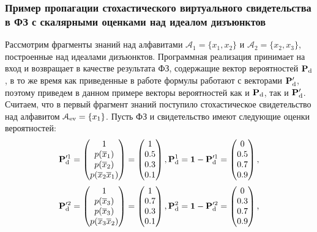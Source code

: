 \subsubsection{Пример пропагации стохастического виртуального свидетельства в ФЗ с скалярными оценками над идеалом дизъюнктов}
Рассмотрим фрагменты знаний над алфавитами $\mathcal{A}_1 = \{x_1, x_2\}$ и  $\mathcal{A}_2 = \{x_2, x_3\}$, построенные над идеалами дизъюнктов. Программная реализация принимает на вход и возвращает в качестве результата ФЗ, содержащие вектор вероятностей $\mathbf{P}_\mathrm{d}$, в то же время как приведенные в работе формулы работают с векторами $\mathbf{P}_\mathrm{d}^{\prime}$, поэтому приведем в данном примере векторы вероятностей как и $\mathbf{P}_\mathrm{d}$, так и $\mathbf{P}_\mathrm{d}^{\prime}$. Считаем, что в первый фрагмент знаний поступило стохастическое свидетельство над алфавитом $\mathcal{A}_{\mathrm{ev}} = \{x_1\}$. Пусть ФЗ и свидетельство имеют следующие оценки вероятностей: \\ 
\begin{equation*}
\mathbf{P}_\mathrm{d}^{\prime 1} =  \begin{pmatrix}
1 \\ p(\overline{x}_1) \\ p(\overline{x}_2) \\ p(\overline{x}_2\overline{x}_1)
\end{pmatrix} = \begin{pmatrix}
1 \\ 0.5\\ 0.3\\ 0.1
\end{pmatrix}, 
\mathbf{P}_\mathrm{d}^1 = \mathbf{1} - \mathbf{P}_\mathrm{d}^{\prime 1} =  \begin{pmatrix}
0 \\ 0.5\\ 0.7\\ 0.9
\end{pmatrix}, 
\end{equation*}
\begin{equation*}
\mathbf{P}_\mathrm{d}^{\prime 2} =  \begin{pmatrix}
1 \\ p(\overline{x}_3) \\ p(\overline{x}_3) \\ p(\overline{x}_3\overline{x}_2)
\end{pmatrix} = \begin{pmatrix}
1 \\ 0.7\\ 0.3\\ 0.1 
\end{pmatrix},
\mathbf{P}_\mathrm{d}^2 = \mathbf{1} - \mathbf{P}_\mathrm{d}^{\prime 2} =  \begin{pmatrix}
0 \\ 0.3\\ 0.7\\ 0.9 \end{pmatrix},
\end{equation*}
